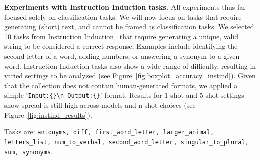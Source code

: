 \documentclass{article} %
\renewcommand{\paragraph}[1]{\textbf{#1}}
\begin{document}
\paragraph{Experiments with Instruction Induction tasks.}
All experiments thus far focused solely on classification tasks. We will now focus on tasks that require generating (short) text, and cannot be framed as classification tasks. We selected 10 tasks from Instruction Induction~\citep{honovich2022instruction} that require generating a unique, valid string to be considered a correct response. Examples include identifying the second letter of a word, adding numbers, or answering a synonym to a given word. Instruction Induction tasks also show a wide range of difficulty, resulting in varied settings to be analyzed (see Figure~\ref{fig:boxplot_accuracy_instind}). Given that the collection does not contain human-generated formats, we applied a simple `\texttt{Input:\hspace{3pt}\{\}\textbackslash n Output:\hspace{3pt}\{\}}' format. Results for 1-shot and 5-shot settings show spread is still high across models and n-shot choices (see Figure~\ref{fig:instind_results}). 

Tasks are: \texttt{antonyms, diff, first\_word\_letter, larger\_animal, letters\_list, num\_to\_verbal, second\_word\_letter, singular\_to\_plural, sum, synonyms}.
\end{document}
